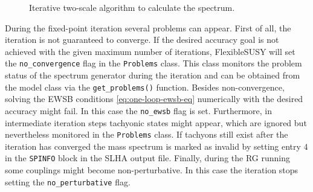 \documentclass[final,3p,11pt,pdflatex]{elsarticle}
\makeatletter
\newcommand{\fs}{FlexibleSUSY\@\xspace}
\newcommand{\code}[1]{\lstinline|#1|}  %
\makeatother
\begin{document}
\begin{figure}[tbh]
  \centering
  \caption{Iterative two-scale algorithm to calculate the spectrum.}
  \label{fig:two-scale-algorithm}
\end{figure}

During the fixed-point iteration several problems can appear.  First
of all, the iteration is not guaranteed to converge.  If the desired
accuracy goal is not achieved with the given maximum number of
iterations, \fs will set the \code{no_convergence} flag in the
\code{Problems} class.  This class monitors the problem status of the
spectrum generator during the iteration and can be obtained from the
model class via the \code{get_problems()} function.  Besides
non-convergence, solving the EWSB conditions
\eqref{eq:one-loop-ewsb-eq} numerically with the desired accuracy
might fail.  In this case the \code{no_ewsb} flag is set.
Furthermore, in intermediate iteration steps tachyonic states might
appear, which are ignored but nevertheless monitored in the
\code{Problems} class.  If tachyons still exist after the iteration
has converged the mass spectrum is marked as invalid by setting entry
$4$ in the \code{SPINFO} block in the SLHA output file.  Finally,
during the RG running some couplings might become non-perturbative.
In this case the iteration stops setting the \code{no_perturbative}
flag.
\end{document}
